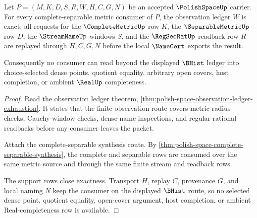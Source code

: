 \begin{theorem}
\label{thm:polish-space-observation-ledger-consumer-exactness}
Let $P=(M,K,D,S,R,W,H,C,G,N)$ be an accepted $\PolishSpaceUp$ carrier. For every complete-separable metric consumer of $P$, the observation ledger $W$ is exact: all requests for the $\CompleteMetricUp$ row $K$, the $\SeparableMetricUp$ row $D$, the $\StreamNameUp$ windows $S$, and the $\RegSeqRatUp$ readback row $R$ are replayed through $H,C,G,N$ before the local $\NameCert$ exports the result.

Consequently no consumer can read beyond the displayed $\BHist$ ledger into choice-selected dense points, quotient equality, arbitrary open covers, host completion, or ambient $\RealUp$ completeness.
\end{theorem}
\begin{proof}
Read the observation ledger theorem, \autoref{thm:polish-space-observation-ledger-exhaustion}. It states that the finite observation route covers metric-radius checks, Cauchy-window checks, dense-name inspections, and regular rational readbacks before any consumer leaves the packet.

Attach the complete-separable synthesis route. By \autoref{thm:polish-space-complete-separable-synthesis}, the complete and separable rows are consumed over the same metric source and through the same finite stream and readback rows.

The support rows close exactness. Transport $H$, replay $C$, provenance $G$, and local naming $N$ keep the consumer on the displayed $\BHist$ route, so no selected dense point, quotient equality, open-cover argument, host completion, or ambient Real-completeness row is available.
\end{proof}

